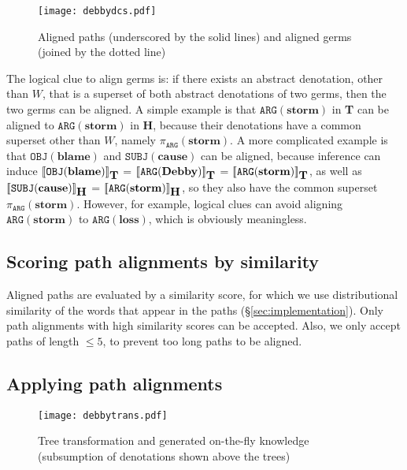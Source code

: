 \documentclass[11pt]{article}
\def\den#1{[\![#1]\!]}
\begin{document}
\begin{figure}[t]
\centering
\texttt{[image: debbydcs.pdf]}
\caption{Aligned paths (underscored by the solid lines) and aligned germs
  (joined by the dotted line)}
\label{fig:debbydcs}
\end{figure}

The logical clue to align germs is: if there exists an abstract denotation, other than 
$W$, that is a superset of both abstract denotations of two germs, then the two germs 
can be aligned. A simple example is that 
$\texttt{ARG}(\textbf{storm})$ in \textbf{T} can be aligned to 
$\texttt{ARG}(\textbf{storm})$ in \textbf{H}, because their denotations have a common 
superset other than $W$, namely $\pi_{\texttt{ARG}}(\textbf{storm})$.  
A more complicated example
is that $\texttt{OBJ}(\textbf{blame})$ and
$\texttt{SUBJ}(\textbf{cause})$ can be aligned, because inference can 
induce  
$\den{\mbox{\texttt{OBJ}}(\mbox{\textbf{blame}})}_{\mbox{\textbf{T}}}$ = 
$\den{\mbox{\texttt{ARG}}(\mbox{\textbf{Debby}})}_{\mbox{\textbf{T}}}$ = 
$\den{\mbox{\texttt{ARG}}(\mbox{\textbf{storm}})}_{\mbox{\textbf{T}}}$,
as well as
$\den{\mbox{\texttt{SUBJ}}(\mbox{\textbf{cause}})}_{\mbox{\textbf{H}}}$ = 
$\den{\mbox{\texttt{ARG}}(\mbox{\textbf{storm}})}_{\mbox{\textbf{H}}}$, 
so they also have the common superset $\pi_{\texttt{ARG}}(\textbf{storm})$. 
However, for example, logical clues can avoid aligning 
$\texttt{ARG}(\textbf{storm})$ to $\texttt{ARG}(\textbf{loss})$, which 
is obviously meaningless.

\subsection{Scoring path alignments by similarity}

Aligned paths are evaluated by a similarity score, for which we use 
distributional similarity of the words that appear in the paths (\S\ref{sec:implementation}). 
Only path alignments with high similarity scores can be accepted. 
Also, we only accept paths of length $\leq 5$, to prevent too long paths to be aligned. 

\subsection{Applying path alignments}
\label{sec:ontheflyapp}

\begin{figure}[t]
\centering
\texttt{[image: debbytrans.pdf]}
\caption{Tree transformation and generated on-the-fly knowledge 
(subsumption of denotations shown above the trees)}
\label{fig:debbytrans}
\end{figure}
\end{document}
